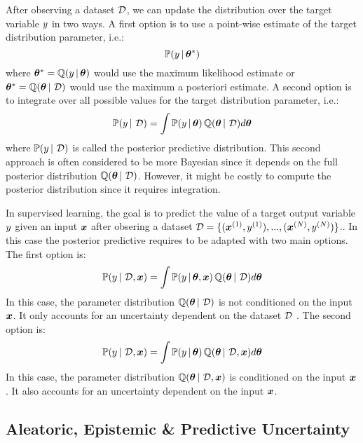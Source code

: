 After observing a dataset $\operatorname{\mathcal{D}}$, we can update the distribution over the target variable $y$ in two ways.
A first option is to use a point-wise estimate of the target distribution parameter, i.e.:
\begin{equation}
    \mathbb{P}(y \,|\, \bm{\theta}^*)
\end{equation}
where $\bm{\theta}^*=\operatorname{\mathbb{Q}}(y \,|\, \bm{\theta})$ would use the maximum likelihood estimate or $\bm{\theta}^*=\operatorname{\mathbb{Q}}(\bm{\theta} \,|\, \operatorname{\mathcal{D}})$ would use the maximum a posteriori estimate.
A second option is to integrate over all possible values for the target distribution parameter, i.e.:
\begin{equation}
    \label{eq:posterior_predictive}
    \mathbb{P}(y \,|\, \operatorname{\mathcal{D}}) = \int \mathbb{P}(y \,|\, \bm{\theta}) \operatorname{\mathbb{Q}}(\bm{\theta} \,|\, \operatorname{\mathcal{D}}) d\bm{\theta}
\end{equation}
where $\mathbb{P}(y \,|\, \operatorname{\mathcal{D}})$ is called the posterior predictive distribution. 
This second approach is often considered to be more Bayesian since it depends on the full posterior distribution $\operatorname{\mathbb{Q}}(\bm{\theta} \,|\, \operatorname{\mathcal{D}})$.
However, it might be costly to compute the posterior distribution since it requires integration.

In supervised learning, the goal is to predict the value of a target output variable $y$ given an input $\bm{x}$ after obsering a dataset $\operatorname{\mathcal{D}}=\{(\bm{x}^{(1)}, y^{(1)}), ..., (\bm{x}^{(N)}, y^{(N)})\}$..
In this case the posterior predictive requires to be adapted with two main options. The first option is:
\begin{equation}
    \mathbb{P}(y \,|\, \operatorname{\mathcal{D}}, \bm{x}) = \int \mathbb{P}(y \,|\, \bm{\theta}, \bm{x}) \operatorname{\mathbb{Q}}(\bm{\theta} \,|\, \operatorname{\mathcal{D}}) d\bm{\theta}
\end{equation}
In this case, the parameter distribution $\operatorname{\mathbb{Q}}(\bm{\theta} \,|\, \operatorname{\mathcal{D}})$ is not conditioned on the input $\bm{x}$. It only accounts for an uncertainty dependent on the dataset $\operatorname{\mathcal{D}}$ .
The second option is:
\begin{equation}
    \mathbb{P}(y \,|\, \operatorname{\mathcal{D}}, \bm{x}) = \int \mathbb{P}(y \,|\, \bm{\theta}) \operatorname{\mathbb{Q}}(\bm{\theta} \,|\, \operatorname{\mathcal{D}}, \bm{x}) d\bm{\theta}
\end{equation}
In this case, the parameter distribution $\operatorname{\mathbb{Q}}(\bm{\theta} \,|\, \operatorname{\mathcal{D}}, \bm{x})$ is conditioned on the input $\bm{x}$. It also accounts for an uncertainty dependent on the input $\bm{x}$.

\subsection{Aleatoric, Epistemic \& Predictive Uncertainty}

